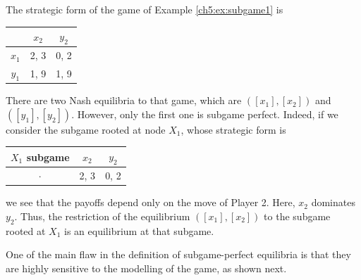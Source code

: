 \begin{example}
The strategic form of the game of Example \ref{ch5:ex:subgame1}
is
\begin{center}
\begin{tabular}{c|cc}
& $x_2$ & $y_2$ \\
\hline
$x_1$ & 2,  3 & 0, 2 \\
$y_1$ & 1, 9 & 1, 9
\end{tabular}
\end{center}
There are two Nash equilibria to that game, which are $([x_1], [x_2])$ and $([y_1], [y_2])$. However, only the first one is subgame perfect. Indeed, if we consider the subgame rooted at node $X_1$, whose strategic form is
\begin{center}
\begin{tabular}{c|cc}
$X_1$ subgame & $x_2$ & $y_2$ \\
\hline
$\cdot$ & 2, 3 & 0, 2 \\
\end{tabular}
\end{center}
we see that the payoffs depend only on the move of Player 2. Here, $x_2$ dominates $y_2$. Thus, the restriction of the equilibrium $([x_1], [x_2])$ to the subgame rooted at $X_1$ is an equilibrium at that subgame.\\
\end{example}
One of the main flaw in the definition of subgame-perfect equilibria is that they are highly sensitive to the modelling of the game, as shown next.

